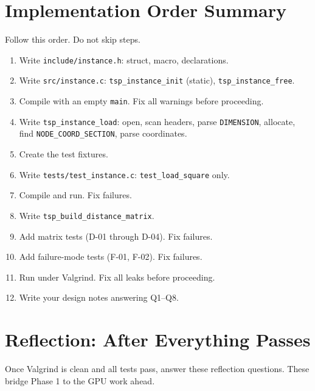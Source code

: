 \newpage

\section{Implementation Order Summary}

Follow this order. Do not skip steps.

\begin{enumerate}[label=\textbf{Step \arabic*.}, leftmargin=*, itemsep=4pt]
  \item Write \texttt{include/instance.h}: struct, macro, declarations.
  \item Write \texttt{src/instance.c}: \texttt{tsp\_instance\_init} (static), \texttt{tsp\_instance\_free}.
  \item Compile with an empty \texttt{main}. Fix all warnings before proceeding.
  \item Write \texttt{tsp\_instance\_load}: open, scan headers, parse \texttt{DIMENSION}, allocate, find \texttt{NODE\_COORD\_SECTION}, parse coordinates.
  \item Create the test fixtures.
  \item Write \texttt{tests/test\_instance.c}: \texttt{test\_load\_square} only.
  \item Compile and run. Fix failures.
  \item Write \texttt{tsp\_build\_distance\_matrix}.
  \item Add matrix tests (D-01 through D-04). Fix failures.
  \item Add failure-mode tests (F-01, F-02). Fix failures.
  \item Run under Valgrind. Fix all leaks before proceeding.
  \item Write your design notes answering Q1--Q8.
\end{enumerate}

\newpage

\section{Reflection: After Everything Passes}

Once Valgrind is clean and all tests pass, answer these reflection questions. These bridge Phase 1 to the GPU work ahead.

